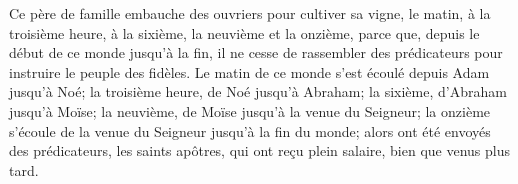 Ce père de famille embauche des ouvriers pour cultiver sa vigne,
	le matin, à la troisième heure, à la sixième, la neuvième et la onzième,
	parce que, depuis le début de ce monde jusqu'à la fin,
	il ne cesse de rassembler des prédicateurs pour instruire le peuple des fidèles.
Le matin de ce monde s'est écoulé depuis Adam jusqu'à Noé;
	la troisième heure, de Noé jusqu'à Abraham;
	la sixième, d'Abraham jusqu'à Moïse;
	la neuvième, de Moïse jusqu'à la venue du Seigneur;
	la onzième s'écoule de la venue du Seigneur jusqu'à la fin du monde;
	alors ont été envoyés des prédicateurs, les saints apôtres,
		qui ont reçu plein salaire, bien que venus plus tard.
